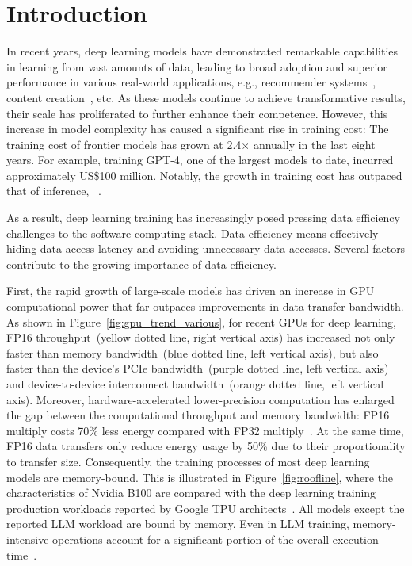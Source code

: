 \chapter{Introduction}

In recent years, deep learning models have demonstrated remarkable capabilities in learning from vast amounts of data, leading to broad adoption and superior performance in various real-world applications, e.g., recommender systems~\cite{Pinterest,naumovDeepLearningRecommendation2019}, content creation~\cite{openaiChatGPT2022,midjourneyMidjourney2022}, etc. As these models continue to achieve transformative results, their scale has proliferated to further enhance their competence. However, this increase in model complexity has caused a significant rise in training cost: The training cost of frontier models has grown at 2.4$\times$ annually in the last eight years. For example, training GPT-4, one of the largest models to date, incurred approximately US\$100 million. Notably, the growth in training  cost has outpaced that of inference, ~\cite{villalobosTradingComputeTraining2023}.



As a result, deep learning training has increasingly posed pressing data efficiency challenges to the software computing stack. Data efficiency means effectively hiding data access latency and avoiding unnecessary data accesses. Several factors contribute to the growing importance of data efficiency. 

First, the rapid growth of large-scale models has driven an increase in GPU computational power that far outpaces improvements in data transfer bandwidth. As shown in Figure~\ref{fig:gpu_trend_various}, for recent GPUs for deep learning, FP16 throughput~(yellow dotted line, right vertical axis) has increased not only faster than memory bandwidth~(blue dotted line, left vertical axis), but also faster than the device's PCIe bandwidth~(purple dotted line, left vertical axis) and device-to-device interconnect bandwidth~(orange dotted line, left vertical axis). Moreover, hardware-accelerated lower-precision computation has enlarged the gap between the computational throughput and memory bandwidth: FP16 multiply costs 70\% less energy compared with FP32 multiply~\cite{billdallyDeepLearningHardware2022}. At the same time, FP16 data transfers only reduce energy usage by 50\% due to their proportionality to transfer size. Consequently, the training processes of most deep learning models are memory-bound. This is illustrated in Figure~\ref{fig:roofline}, where the characteristics of Nvidia B100 are compared with the deep learning training production workloads reported by Google TPU architects~\cite{jouppiTPUV4}. All models except the reported LLM workload are bound by memory. Even in LLM training, memory-intensive operations account for a significant portion of the overall execution time~\cite{liLLMAnalysisLatencyMemory2023,yuanLLMInferenceUnveiled2024}.


